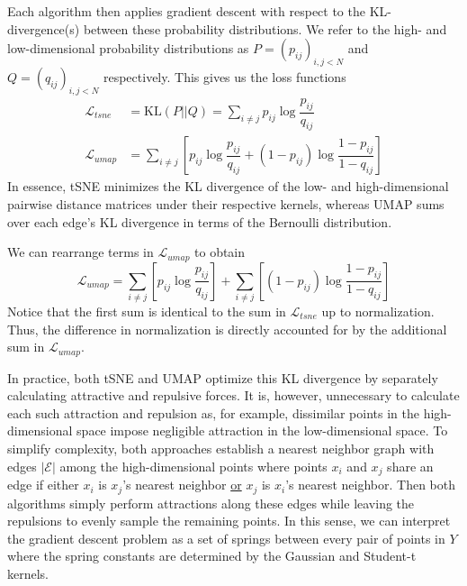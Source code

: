 \documentclass{article}
\theoremstyle{definition}
\begin{document}
\begin{multicols}{2}
Each algorithm then applies gradient descent with respect to the KL-divergence(s) between these probability distributions. We refer to the high- and
low-dimensional probability
distributions as $P = \left( p_{ij} \right)_{i, j < N}$ and $Q = \left( q_{ij}
\right)_{i, j < N}$ respectively. This gives us the loss functions
\begin{align}
    \mathcal{L}_{tsne} &= \text{KL} (P || Q) = \sum_{i \neq j} p_{ij} \log \dfrac{p_{ij}}{q_{ij}} \\
    \mathcal{L}_{umap} &= \sum_{i \neq j} \left[ p_{ij} \log \dfrac{p_{ij}}{q_{ij}} + (1 - p_{ij}) \log \dfrac{1 - p_{ij}}{1 - q_{ij}} \right]
\end{align}
In essence, tSNE minimizes the KL divergence of the low- and high-dimensional pairwise distance matrices under their respective kernels, whereas UMAP sums over
each edge's KL divergence in terms of the Bernoulli distribution.

We can rearrange terms in $\mathcal{L}_{umap}$ to obtain
\[ \mathcal{L}_{umap} = \sum_{i \neq j} \left[ p_{ij} \log \dfrac{p_{ij}}{q_{ij}} \right] + \sum_{i \neq j} \left[ (1 - p_{ij}) \log \dfrac{1 - p_{ij}}{1 - q_{ij}} \right] \]
Notice that the first sum is identical to the sum in $\mathcal{L}_{tsne}$ up to normalization. Thus, the difference in normalization is directly accounted for
by the additional sum in $\mathcal{L}_{umap}$.

In practice, both tSNE and UMAP optimize this KL divergence by separately calculating attractive and repulsive forces. It is, however, unnecessary to calculate
each such attraction and repulsion as, for example, dissimilar points in the high-dimensional space impose negligible attraction in the low-dimensional space.
To simplify complexity, both approaches establish a nearest neighbor graph \cite{van2014accelerating} with edges $|\mathcal{E}|$ among the
high-dimensional points where points $x_i$ and $x_j$ share an edge if either $x_i$ is $x_j$'s nearest neighbor \underline{or} $x_j$ is $x_i$'s nearest neighbor.
Then both algorithms simply perform attractions along these edges while leaving the repulsions to evenly sample the remaining points. In this sense, we can
interpret the gradient descent problem as a set of springs between every pair of points in $Y$ where the spring constants are determined by the Gaussian and
Student-t kernels.


\end{multicols}
\end{document}
